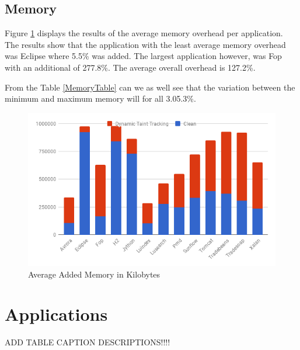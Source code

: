 \subsection{Memory}
Figure \ref{fig:Memory} displays the results of the average memory overhead per application. The results show that the application with the least average memory overhead was Eclipse where 5.5\% was added. The largest application however, was Fop with an additional of 277.8\%. The average overall overhead is 127.2\%.

From the Table \ref{MemoryTable} can we as well see that the variation between the minimum and maximum memory will for all 3.05.3\%.

\begin{figure}[!h]
	\centering
	\includegraphics[width=\textwidth]{images/Memory.png}
	\caption{Average Added Memory in Kilobytes}
	\label{fig:Memory}
\end{figure}



\section{Applications}
ADD TABLE CAPTION DESCRIPTIONS!!!!



\begin{table}[!h]
  \centering
  \caption{Stanford SecuriBench Micro}
  \label{table:MicroTable}
\end{table}


